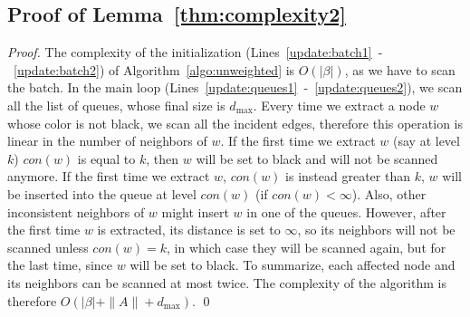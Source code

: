 \documentclass[english]{llncs}
\begin{document}
\subsection{Proof of Lemma~\ref{thm:complexity2}}
\label{sub:proof_complexity2}
\begin{proof}
The complexity of the initialization (Lines~\ref{update:batch1}~-~\ref{update:batch2}) of Algorithm~\ref{algo:unweighted}
is $O(|\beta|)$, as we have to scan the batch. In the main loop (Lines~\ref{update:queues1}~-~\ref{update:queues2}), we scan all the list
of queues, whose final size is $d_{\max}$. 
Every time we extract a node $w$ whose color is not black, we scan all the 
incident edges, therefore this operation is linear in the number of neighbors of $w$. 
If the first time we extract $w$ (say at level $k$) $con(w) $ is equal to $k$, then $w$ will be set to black and will not be scanned anymore.
If the first time we extract $w$, $con(w)$ is instead greater than $k$, $w$ will be inserted into the queue at level $con(w)$ (if $con(w)<\infty$). 
Also, other inconsistent neighbors of $w$ might insert $w$ in one of the queues. However, after the first time $w$ is extracted,
its distance is set to $\infty$, so its neighbors will not be scanned unless $con(w)=k$, in which case 
they will be scanned again, but for the last time, since $w$ will be set to black. To summarize, each affected node and its neighbors can 
be scanned at most twice. The complexity of the
algorithm is therefore $O(|\beta|+\|A\|+d_{\max})$. \qed
\end{proof}
\end{document}
